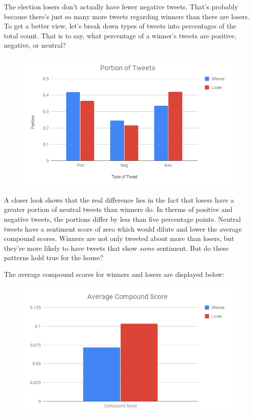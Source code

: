 \documentclass[11pt, twoside, reqno]{article}
\begin{document}
The election losers don't actually have fewer negative tweets. That's probably because there's just so many more tweets regarding winners than there are losers. To get a better view, let's break down types of tweets into percentages of the total count. That is to say, what percentage of a winner's tweets are positive, negative, or neutral?

\begin{figure}[H]
\centering
	\includegraphics[scale=0.5]{tweet_breakdown}	
\end{figure}

A closer look shows that the real difference lies in the fact that losers have a greater portion of neutral tweets than winners do. In therms of positive and negative tweets, the portions differ by less than five percentage points. Neutral tweets have a sentiment score of zero which would dilute and lower the average compound scores. Winners are not only tweeted about more than losers, but they're more likely to have tweets that show \textit{some} sentiment. But do these patterns hold true for the house?

The average compound scores for winners and losers are displayed below:

\begin{figure}[H]
\centering
	\includegraphics[scale=0.5]{house_compound}
\end{figure}
\end{document}
